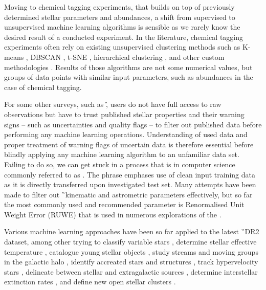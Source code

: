 Moving to chemical tagging experiments, that builds on top of previously determined stellar parameters and abundances, a shift from supervised to unsupervised machine learning algorithms is sensible as we rarely know the desired result of a conducted experiment. In the literature, chemical tagging experiments often rely on existing unsupervised clustering methods such as K-means \cite{2015A&A...577A..47B, 2016ApJ...833..262H, 2018ApJ...860...70C}, DBSCAN \cite{2019MNRAS.487..871P}, t-SNE \cite{2018MNRAS.473.4612K, 2018A&A...619A.125A}, hierarchical clustering \cite{2017MNRAS.467.1140J, 2018A&A...618A..65B}, and other custom methodologies \cite{2019ApJ...887...73C}. Results of those algorithms are not some numerical values, but groups of data points with similar input parameters, such as abundances in the case of chemical tagging.

For some other surveys, such as \G, users do not have full access to raw observations but have to trust published stellar properties and their warning signs -- such as uncertainties and quality flags -- to filter out published data before performing any machine learning operations. Understanding of used data and proper treatment of warning flags of uncertain data is therefore essential before blindly applying any machine learning algorithm to an unfamiliar data set. Failing to do so, we can get stuck in a process that is in computer science commonly referred to as . The phrase emphases use of clean input training data as it is directly transferred upon investigated test set. Many attempts have been made to filter out \G\ kinematic and astrometric parameters effectively, but so far the most commonly used and recommended parameter is Renormalised Unit Weight Error (RUWE) \cite{ruwe} that is used in numerous explorations of the \Gs. 

Various machine learning approaches have been so far applied to the latest \G\ DR2 dataset, among other trying to classify variable stars \cite{2020MNRAS.493.2981B}, determine stellar effective temperature \cite{2019AJ....158...93B}, catalogue young stellar objects \cite{2019MNRAS.487.2522M}, study streams and moving groups in the galactic halo \cite{2017A&A...598A..58H, 2020MNRAS.492.1370B}, identify accreated stars and structures \cite{2019arXiv190706652O, 2019arXiv190707681N}, track hypervelocity stars \cite{2017MNRAS.470.1388M}, delineate between stellar and extragalactic sources \cite{2018RAA....18..118B, 2019MNRAS.490.5615B}, determine interstellar extinction rates \cite{2020AJ....159...84B}, and define new open stellar clusters \cite{2020A&A...635A..45C}.

